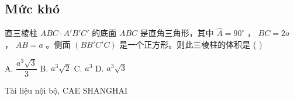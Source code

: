 \documentclass[11pt, a4paper]{article}
\begin{document}
\subsection{Mức khó}

\begin{baitap}[10]
直三棱柱 $ABC \cdot A'B'C'$ 的底面 $ABC$ 是直角三角形，其中 $\hat{A} = 90^\circ$ ， $BC = 2a$ ， $AB = a$ 。侧面 $(BB'C'C)$ 是一个正方形。则此三棱柱的体积是 ( )
\par\vspace{3pt}
\noindent A. $\dfrac{a^3\sqrt{3}}{3}$ \quad B. $a^3\sqrt{2}$ \quad C. $a^3$ \quad D. $a^3\sqrt{3}$
\end{baitap}
\vspace{0.8cm}
\begin{center}
{\footnotesize\color{cae_blue} Tài liệu nội bộ, CAE SHANGHAI}
\end{center}
\end{document}
